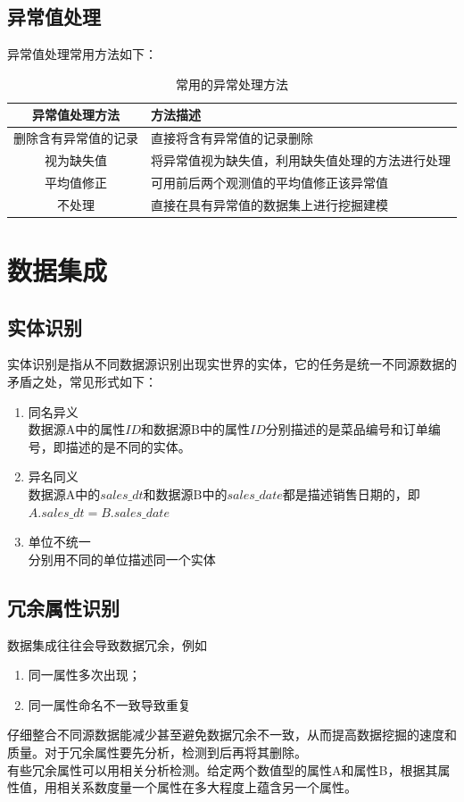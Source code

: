 \documentclass[openany]{progbookcn}
\begin{document}
\subsection{异常值处理}
\indent 异常值处理常用方法如下：
\begin{table}[h]
\centering
\begin{tabular}{|c|l|}
\hline
{\bf 异常值处理方法}&{\bf 方法描述}\\
\hline
删除含有异常值的记录 & 直接将含有异常值的记录删除\\
\hline
视为缺失值 & 将异常值视为缺失值，利用缺失值处理的方法进行处理\\
\hline
平均值修正 & 可用前后两个观测值的平均值修正该异常值\\
\hline
不处理 & 直接在具有异常值的数据集上进行挖掘建模\\
\hline
\end{tabular}
\caption{常用的异常处理方法}
\end{table}
\section{数据集成}
\subsection{实体识别}
\indent 实体识别是指从不同数据源识别出现实世界的实体，它的任务是统一不同源数据的矛盾之处，常见形式如下：
\begin{enumerate}
\item 同名异义\\
\indent 数据源A中的属性$ID$和数据源B中的属性$ID$分别描述的是菜品编号和订单编号，即描述的是不同的实体。
\item 异名同义\\
\indent 数据源A中的$sales\_dt$和数据源B中的$sales\_date$都是描述销售日期的，即$A.sales\_dt=B.sales\_date$
\item 单位不统一\\
\indent 分别用不同的单位描述同一个实体
\end{enumerate}
\subsection{冗余属性识别}
\indent 数据集成往往会导致数据冗余，例如
\begin{enumerate}[itemindent=2em]
\item 同一属性多次出现；
\item 同一属性命名不一致导致重复
\end{enumerate}
\indent \indent 仔细整合不同源数据能减少甚至避免数据冗余不一致，从而提高数据挖掘的速度和质量。对于冗余属性要先分析，检测到后再将其删除。\\
\indent 有些冗余属性可以用相关分析检测。给定两个数值型的属性A和属性B，根据其属性值，用相关系数度量一个属性在多大程度上蕴含另一个属性。
\end{document}
